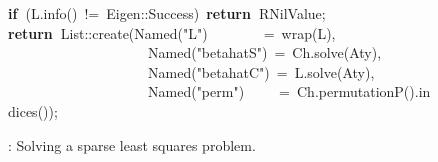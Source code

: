\documentclass[shortnames,article]{jss}
\newcommand{\hlstd}[1]{\textcolor[rgb]{0,0,0}{#1}}
\newcommand{\hlopt}[1]{\textcolor[rgb]{0,0,0}{#1}}
\newcommand{\hlstr}[1]{\textcolor[rgb]{0.90,0.15,0.15}{#1}}
\newcommand{\hlkwa}[1]{\textcolor[rgb]{0.61,0.13,0.93}{\bf{#1}}}
\newcommand{\hlkwd}[1]{\textcolor[rgb]{0,0,0}{#1}}
\begin{document}
\begin{figure}[htb]
    \hlstd{}\hlkwa{if\ }\hlstd{}\hlopt{(}\hlstd{L}\hlopt{.}\hlstd{}\hlkwd{info}\hlstd{}\hlopt{()\ !=\ }\hlstd{Eigen}\hlopt{::}\hlstd{Success}\hlopt{)\ }\hlstd{}\hlkwa{return\ }\hlstd{R\textunderscore NilValue}\hlopt{;}\hspace*{\fill}\\
    \hlstd{}\hlkwa{return\ }\hlstd{List}\hlopt{::}\hlstd{}\hlkwd{create}\hlstd{}\hlopt{(}\hlstd{Named}\hlopt{{(}}\hlstd{}\hlstr{"L"}\hlstd{}\hlopt{{)}}\hlstd{\ \ \ \ \ \ \ \ }\hlopt{=\ }\hlstd{}\hlkwd{wrap}\hlstd{}\hlopt{(}\hlstd{L}\hlopt{),}\hspace*{\fill}\\
    \hlstd{}\hlstd{\ \ \ \ \ \ \ \ \ \ \ \ \ \ \ \ \ \ \ \ }\hlstd{Named}\hlopt{{(}}\hlstd{}\hlstr{"betahatS"}\hlstd{}\hlopt{{)}\ =\ }\hlstd{Ch}\hlopt{.}\hlstd{}\hlkwd{solve}\hlstd{}\hlopt{(}\hlstd{Aty}\hlopt{),}\hspace*{\fill}\\
    \hlstd{}\hlstd{\ \ \ \ \ \ \ \ \ \ \ \ \ \ \ \ \ \ \ \ }\hlstd{Named}{{(}}\hlstd{}\hlstr{"betahatC"}\hlstd{}\hlopt{{)}\ =\ }\hlstd{L}\hlopt{.}\hlstd{}\hlkwd{solve}\hlstd{}\hlopt{(}\hlstd{Aty}\hlopt{),}\hspace*{\fill}\\
    \hlstd{}\hlstd{\ \ \ \ \ \ \ \ \ \ \ \ \ \ \ \ \ \ \ \ }\hlstd{Named}\hlopt{{(}}\hlstd{}\hlstr{"perm"}\hlstd{}\hlopt{{)}}\hlstd{\ \ \ \ \ }\hlopt{=\ }\hlstd{Ch}\hlopt{.}\hlstd{}\hlkwd{permutationP}\hlstd{}\hlopt{().}\hlstd{}\hlkwd{indices}\hlstd{}\hlopt{());}\hlstd{}\hspace*{\fill}\\
    \mbox{}
    \normalfont
    \normalsize
  \caption{: Solving a sparse least squares problem.}
  \label{fig:spLS}
\end{figure}
\end{document}
